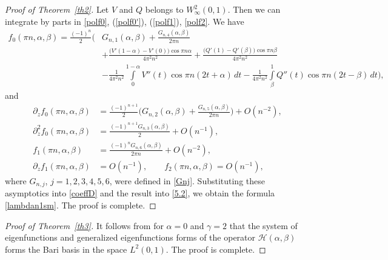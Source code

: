 \documentclass[10pt, a4paper]{article}
\theoremstyle{plain}
\theoremstyle{definition}
\numberwithin{equation}{section}
\def\a{\alpha}
\def\b{\beta}
\begin{document}
\begin{proof}[Proof of Theorem~\ref{th2}]
Let $V$ and $Q$ belongs to $W_\infty^2(0, 1)$.
Then we can integrate by parts in
\eqref{polf0}, (\ref{polf0'}), (\ref{polf1}), \eqref{polf2}. We have
\begin{align*}
f_0(\pi n,\a,\b)= \frac{(-1)^n}{2}\bigg(&G_{n, 1}(\alpha, \beta)
+\frac{G_{n, 4}(\alpha, \beta)}{2\pi n}
\\
&+\frac{\big(V'(1-\alpha)-V'(0)\big)\cos\pi n\alpha}{4\pi^2n^2}
+\frac{\big(Q'(1)-Q'(\beta)\big)\cos\pi n\beta}{4\pi^2 n^2}\\
&-\frac{1}{4\pi^2n^2}\int\limits_0^{1-\alpha}V''(t)\cos\pi n(2t+\alpha)\,dt
-\frac{1}{4\pi^2n^2}\int\limits_\beta^{1}Q''(t)\cos\pi n(2t-\beta)\,dt\bigg),
\end{align*}
and
\begin{align*}
\partial_z f_0(\pi n,\a,\b) &= \frac{(-1)^{n+1}}{2}\bigg(G_{n, 2}(\alpha, \beta)
+\frac{G_{n, 5}(\alpha, \beta)}{2\pi n}\bigg) +O(n^{-2}), \\
 \partial_z^2 f_0(\pi n,\alpha,\beta) &=\frac{(-1)^{n+1}G_{n, 3}(\alpha, \beta)}{2}+O(n^{-1}),
  \\
f_1(\pi n,\a,\b) &=\frac{(-1)^nG_{n, 6}(\alpha, \beta)}{2\pi n}+O(n^{-2}),
\\
 \partial_z f_1(\pi n,\a,\b)&=O(n^{-1}),\qquad f_2(\pi n,\a,\b)=O(n^{-1}),
\end{align*}
where $G_{n, j}$, $j=1, 2, 3, 4, 5, 6$, were defined in \eqref{Gnj}.
Substituting these asymptotics into \eqref{coeffD} and the result into \eqref{5.2}, we obtain
the formula \eqref{lambdan1sm}. The proof is complete.
\end{proof}

\begin{proof}[Proof of Theorem~\ref{th3}]
It follows from \cite[Theorem~3.4, Remark~3.5]{MityaginSiegl} for $\alpha=0$ and $\gamma=2$ that the system
of eigenfunctions and generalized eigenfunctions forms of the operator $\mathcal{H}(\alpha, \beta)$ forms
the Bari basis in the space $L^2(0, 1)$. The proof is complete.
\end{proof}
\end{document}
